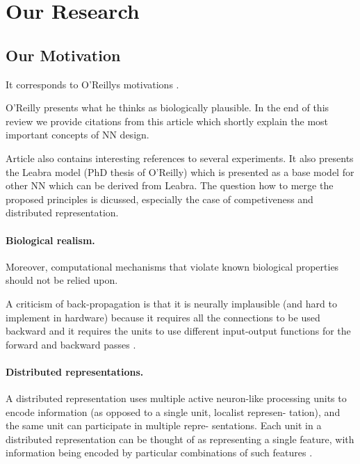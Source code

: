 \section{Our Research} 

\subsection{Our Motivation}

It corresponds to O'Reillys motivations \cite{o1998six}.

O'Reilly presents what he thinks as biologically plausible. In the end of this review we provide citations from this article which shortly explain the most important concepts of NN design. 

Article also contains interesting references to several experiments. It also presents the Leabra model (PhD thesis of O'Reilly) which is presented as a base model for other NN which can be derived from Leabra. The question how to merge the proposed principles is dicussed, especially the case of competiveness and distributed representation. 

\paragraph{Biological realism.} Moreover, computational mechanisms that violate
known biological properties should not be relied upon. 

A criticism of back-propagation is that it is neurally implausible (and hard to implement in hardware) because it requires all the connections to be used backward and it requires the units to use different input-output functions for the forward and backward passes \cite{hinton1988learning}.

\paragraph{Distributed representations.} A distributed representation
uses multiple active neuron-like processing units to encode
information (as opposed to a single unit, localist represen-
tation), and the same unit can participate in multiple repre-
sentations. Each unit in a distributed representation can be
thought of as representing a single feature, with information
being encoded by particular combinations of such features \cite{hinton1988learning}.


